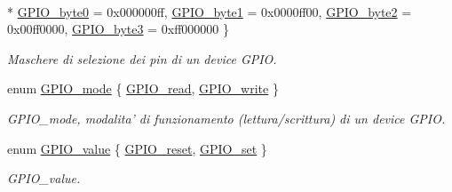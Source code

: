 \begin{DoxyCompactItemize}
\\*
\hyperlink{group___g_p_i_o___g_r_o_u_p_gga6d5aef8a8a54ee2f602d47252ff66595a8f89521ea70b3aed4a18c33a099b98d0}{G\+P\+I\+O\+\_\+byte0} = 0x000000ff, 
\hyperlink{group___g_p_i_o___g_r_o_u_p_gga6d5aef8a8a54ee2f602d47252ff66595a2a36eaac21d68a35dd3b3d1f790b4431}{G\+P\+I\+O\+\_\+byte1} = 0x0000ff00, 
\hyperlink{group___g_p_i_o___g_r_o_u_p_gga6d5aef8a8a54ee2f602d47252ff66595acf385bd78e3d36725f9d82955fce5fcf}{G\+P\+I\+O\+\_\+byte2} = 0x00ff0000, 
\hyperlink{group___g_p_i_o___g_r_o_u_p_gga6d5aef8a8a54ee2f602d47252ff66595adf78991a114e960df39d947c450de88c}{G\+P\+I\+O\+\_\+byte3} = 0xff000000
 \}
\begin{DoxyCompactList}\small\item\em Maschere di selezione dei pin di un device G\+P\+I\+O. \end{DoxyCompactList}\item 
enum \hyperlink{group___g_p_i_o___g_r_o_u_p_ga894e6ae857ed4a9aedd04fff44a6770e}{G\+P\+I\+O\+\_\+mode} \{ \hyperlink{group___g_p_i_o___g_r_o_u_p_gga894e6ae857ed4a9aedd04fff44a6770ea3db3c7d228d9b87cc125c8974241c800}{G\+P\+I\+O\+\_\+read}, 
\hyperlink{group___g_p_i_o___g_r_o_u_p_gga894e6ae857ed4a9aedd04fff44a6770eab1b932c1d800b09eb45b7ff5750bf73c}{G\+P\+I\+O\+\_\+write}
 \}
\begin{DoxyCompactList}\small\item\em G\+P\+I\+O\+\_\+mode, modalita' di funzionamento (lettura/scrittura) di un device G\+P\+I\+O. \end{DoxyCompactList}\item 
enum \hyperlink{group___g_p_i_o___g_r_o_u_p_ga495d9a7aa735fe416a3f110337c54967}{G\+P\+I\+O\+\_\+value} \{ \hyperlink{group___g_p_i_o___g_r_o_u_p_gga495d9a7aa735fe416a3f110337c54967a93cbe0e318453de590a9cb0030a840fa}{G\+P\+I\+O\+\_\+reset}, 
\hyperlink{group___g_p_i_o___g_r_o_u_p_gga495d9a7aa735fe416a3f110337c54967a39769e54aa8c4b6fbad0ef4ae88b5c44}{G\+P\+I\+O\+\_\+set}
 \}
\begin{DoxyCompactList}\small\item\em G\+P\+I\+O\+\_\+value. \end{DoxyCompactList}\end{DoxyCompactItemize}

